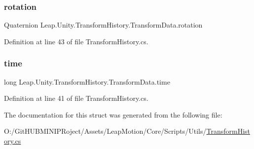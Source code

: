\subsubsection{\texorpdfstring{rotation}{rotation}}
{\footnotesize\ttfamily Quaternion Leap.\+Unity.\+Transform\+History.\+Transform\+Data.\+rotation}



Definition at line 43 of file Transform\+History.\+cs.

\mbox{\label{struct_leap_1_1_unity_1_1_transform_history_1_1_transform_data_aa34ce37b52533024f62c484923bbf17f}} 
\subsubsection{\texorpdfstring{time}{time}}
{\footnotesize\ttfamily long Leap.\+Unity.\+Transform\+History.\+Transform\+Data.\+time}



Definition at line 41 of file Transform\+History.\+cs.



The documentation for this struct was generated from the following file\+:\begin{DoxyCompactItemize}
\item 
O\+:/\+Git\+H\+U\+B\+M\+I\+N\+I\+P\+Roject/\+Assets/\+Leap\+Motion/\+Core/\+Scripts/\+Utils/\mbox{\hyperlink{_transform_history_8cs}{Transform\+History.\+cs}}\end{DoxyCompactItemize}

